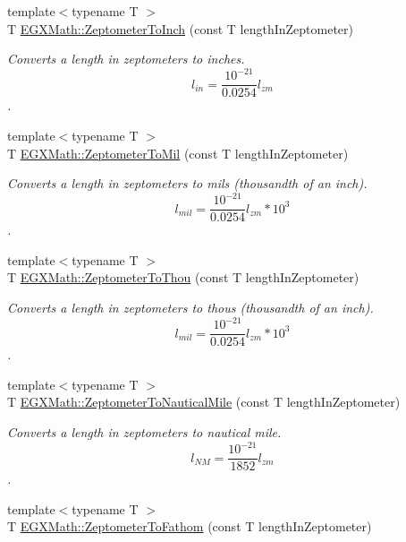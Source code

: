 \begin{DoxyCompactItemize}
{\footnotesize template$<$typename T $>$ }\\T \mbox{\hyperlink{group___e_g_x_math-_conversions-_length_conversions-_s_i-_zeptometer-_imperial_ga6bd6b3ee6932c6aa40442a9bff2580cb}{E\+G\+X\+Math\+::\+Zeptometer\+To\+Inch}} (const T length\+In\+Zeptometer)
\begin{DoxyCompactList}\small\item\em Converts a length in zeptometers to inches. \[ l_{in}= \frac{10^{-21}}{0.0254} l_{zm} \]. \end{DoxyCompactList}\item 
{\footnotesize template$<$typename T $>$ }\\T \mbox{\hyperlink{group___e_g_x_math-_conversions-_length_conversions-_s_i-_zeptometer-_imperial_ga68abfac4247069bdffc24002b0636495}{E\+G\+X\+Math\+::\+Zeptometer\+To\+Mil}} (const T length\+In\+Zeptometer)
\begin{DoxyCompactList}\small\item\em Converts a length in zeptometers to mils (thousandth of an inch). \[ l_{mil}= \frac{10^{-21}}{0.0254} l_{zm} * 10^{3} \]. \end{DoxyCompactList}\item 
{\footnotesize template$<$typename T $>$ }\\T \mbox{\hyperlink{group___e_g_x_math-_conversions-_length_conversions-_s_i-_zeptometer-_imperial_ga14432ed712e073dcae040496f83464b6}{E\+G\+X\+Math\+::\+Zeptometer\+To\+Thou}} (const T length\+In\+Zeptometer)
\begin{DoxyCompactList}\small\item\em Converts a length in zeptometers to thous (thousandth of an inch). \[ l_{mil}= \frac{10^{-21}}{0.0254} l_{zm} * 10^{3} \]. \end{DoxyCompactList}\item 
{\footnotesize template$<$typename T $>$ }\\T \mbox{\hyperlink{group___e_g_x_math-_conversions-_length_conversions-_s_i-_zeptometer-_nautical_ga9d6a1de6b4a8de39ba16da0a17cdca42}{E\+G\+X\+Math\+::\+Zeptometer\+To\+Nautical\+Mile}} (const T length\+In\+Zeptometer)
\begin{DoxyCompactList}\small\item\em Converts a length in zeptometers to nautical mile. \[ l_{NM}= \frac{10^{-21}}{1852} l_{zm} \]. \end{DoxyCompactList}\item 
{\footnotesize template$<$typename T $>$ }\\T \mbox{\hyperlink{group___e_g_x_math-_conversions-_length_conversions-_s_i-_zeptometer-_nautical_ga338ca94378cf11aca399ecdfc859950a}{E\+G\+X\+Math\+::\+Zeptometer\+To\+Fathom}} (const T length\+In\+Zeptometer)

\end{DoxyCompactItemize}
